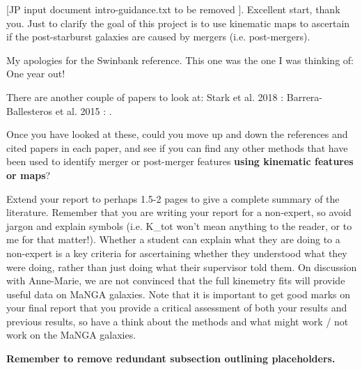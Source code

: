 [JP input document intro-guidance.txt to be removed ]. Excellent start, thank you. Just to clarify the goal of this project is to use kinematic maps to ascertain if the post-starburst galaxies are caused by mergers (i.e. post-mergers). 

My apologies for the Swinbank reference. This one was the one I was thinking of: \citet{2012MNRAS.420..672S} One year out!
 
There are another couple of papers to look at:
Stark et al. 2018 : \citep{2018MNRAS.480.2217S} 
Barrera-Ballesteros et al. 2015 : \citet{2015A&A...582A..21B}.
 
Once you have looked at these, could you move up and down the references and cited papers in each paper, and see if you can find any other methods that have been used to identify merger or post-merger features \textbf{using kinematic features or maps}?
 
Extend your report to perhaps 1.5-2 pages to give a complete summary of the literature.
Remember that you are writing your report for a non-expert, so avoid jargon and explain symbols (i.e. K\_tot won't mean anything to the reader, or to me for that matter!). Whether a student can explain what they are doing to a non-expert is a key criteria for ascertaining whether they understood what they were doing, rather than just doing what their supervisor told them.  On discussion with Anne-Marie, we are not convinced that the full kinemetry fits will provide useful data on MaNGA galaxies. Note that it is important to get good marks on your final report that you provide a critical assessment of both your results and previous results, so have a think about the methods and what might work / not work on the MaNGA galaxies. 

\vspace{6pt}
\textbf{Remember to remove redundant subsection outlining placeholders.}